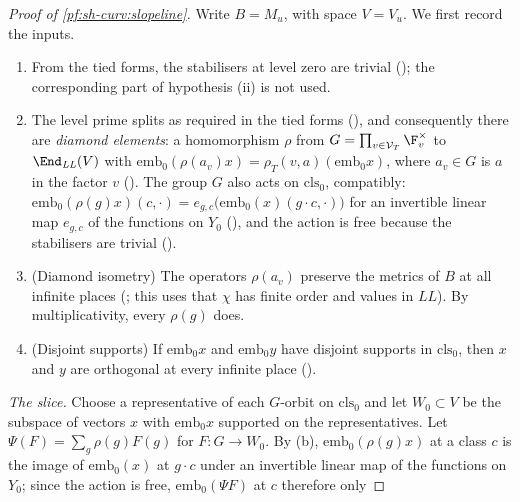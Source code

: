 \begin{proof}[Proof of \cref{pf:sh-curv:slopeline}]
Write $B=M_u$, with space $V=V_u$. We first record the inputs.
\begin{enumerate}[label=(\alph*)]
\item From the tied forms, the stabilisers at level zero are trivial
(); the
corresponding part of hypothesis (ii) is not used.
\item The level prime splits as required in the tied forms
(), and consequently there are
\emph{diamond elements}: a homomorphism $\rho$ from $G=\prod_{v\in\mathcal V_T}\F_v^\times$ to $\End_{\mathit{LL}}(V)$ with
$\mathrm{emb}_0(\rho(a_v)x)=\rho_T(v,a)(\mathrm{emb}_0x)$, where $a_v\in G$ is $a$ in the factor $v$
(). The group $G$ also acts
on $\mathrm{cls}_0$, compatibly: $\mathrm{emb}_0(\rho(g)x)(c,\cdot)=e_{g,c}\bigl(\mathrm{emb}_0(x)(g\cdot c,\cdot)\bigr)$ for an
invertible linear map $e_{g,c}$ of the functions on $Y_0$
(), and the action is free
because the stabilisers are trivial ().
\item (Diamond isometry) The operators $\rho(a_v)$ preserve the metrics of $B$ at all infinite places
(; this uses that $\chi$ has
finite order and values in $\mathit{LL}$). By multiplicativity, every $\rho(g)$ does.
\item (Disjoint supports) If $\mathrm{emb}_0x$ and $\mathrm{emb}_0y$ have disjoint supports in $\mathrm{cls}_0$, then $x$ and
$y$ are orthogonal at every infinite place
().
\end{enumerate}
\emph{The slice.} Choose a representative of each $G$-orbit on $\mathrm{cls}_0$ and let $W_0\subset V$ be the subspace of
vectors $x$ with $\mathrm{emb}_0x$ supported on the representatives. Let $\Psi(F)=\sum_g\rho(g)F(g)$ for $F\colon G\to
W_0$. By (b), $\mathrm{emb}_0(\rho(g)x)$ at a class $c$ is the image of $\mathrm{emb}_0(x)$ at $g\cdot c$ under an
invertible linear map of the functions on $Y_0$; since the action is free, $\mathrm{emb}_0(\Psi F)$ at $c$ therefore only

\end{proof}
